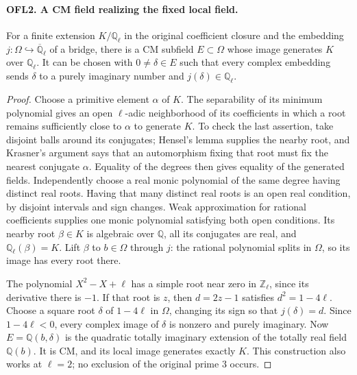 \paragraph{OFL2. A CM field realizing the fixed local field.}
\label{claim:OFL2}
For a finite extension \(K/\mathbb Q_\ell\) in the original
coefficient closure and the embedding \(j:\Omega\hookrightarrow
\overline{\mathbb Q}_\ell\) of a bridge, there is a CM subfield
\(E\subset\Omega\) whose image generates \(K\) over
\(\mathbb Q_\ell\).  It can be chosen with
\(0\ne\delta\in E\) such that every complex embedding sends
\(\delta\) to a purely imaginary number and \(j(\delta)\in
\mathbb Q_\ell\).
\begin{proof}
Choose a primitive element \(\alpha\) of \(K\).  The separability
of its minimum polynomial gives an open \(\ell\)-adic neighborhood
of its coefficients in which a root remains sufficiently close to
\(\alpha\) to generate \(K\).  To check the last assertion,
take disjoint balls around its conjugates; Hensel's lemma supplies
the nearby root, and Krasner's argument says that an automorphism
fixing that root must fix the nearest conjugate \(\alpha\).
Equality of the degrees then gives equality of the generated fields.
Independently choose a real monic polynomial of the same degree
having distinct real roots.  Having that many distinct real roots is
an open real condition, by disjoint intervals and sign changes.
Weak approximation for rational coefficients supplies one monic
polynomial satisfying both open conditions.  Its nearby root
\(\beta\in K\) is algebraic over \(\mathbb Q\), all its
conjugates are real, and \(\mathbb Q_\ell(\beta)=K\).
Lift \(\beta\) to \(b\in\Omega\) through \(j\): the
rational polynomial splits in \(\Omega\), so its image has every
root there.

The polynomial \(X^2-X+\ell\) has a simple root near zero in
\(\mathbb Z_\ell\), since its derivative there is \(-1\).
If that root is \(z\), then \(d=2z-1\) satisfies
\(d^2=1-4\ell\).  Choose a square root \(\delta\) of
\(1-4\ell\) in \(\Omega\), changing its sign so that
\(j(\delta)=d\).  Since \(1-4\ell<0\), every complex image
of \(\delta\) is nonzero and purely imaginary.
Now \(E=\mathbb Q(b,\delta)\) is the quadratic totally imaginary
extension of the totally real field \(\mathbb Q(b)\).  It is CM,
and its local image generates exactly \(K\).  This construction
also works at \(\ell=2\); no exclusion of the original prime
\(3\) occurs.
\end{proof}

